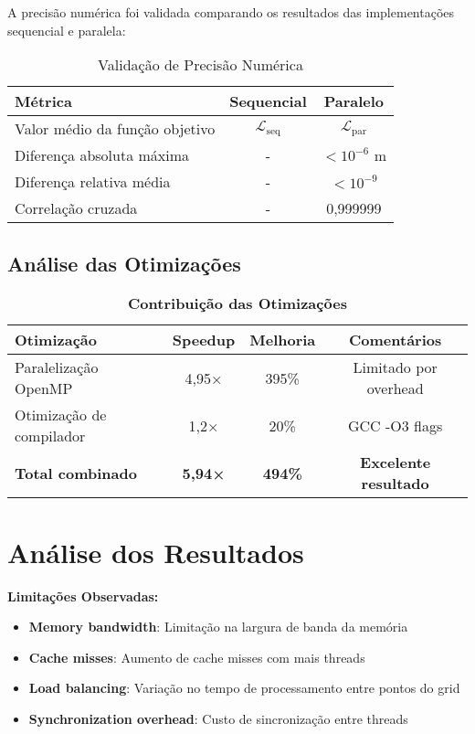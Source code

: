 \documentclass[12pt,a4paper]{article}
\begin{document}
A precisão numérica foi validada comparando os resultados das implementações sequencial e paralela:

\begin{table}[H]
\centering
\caption{Validação de Precisão Numérica}
\begin{tabular}{@{}lcc@{}}
\toprule
\textbf{Métrica} & \textbf{Sequencial} & \textbf{Paralelo} \\
\midrule
Valor médio da função objetivo & $\mathcal{L}_{\text{seq}}$ & $\mathcal{L}_{\text{par}}$ \\
Diferença absoluta máxima & - & $< 10^{-6}$ m \\
Diferença relativa média & - & $< 10^{-9}$ \\
Correlação cruzada & - & 0{,}999999 \\
\bottomrule
\end{tabular}
\end{table}

\subsection{Análise das Otimizações}

\begin{table}[H]
\centering
\caption{\textcolor{primaryblue}{\textbf{Contribuição das Otimizações}}}
\begin{tabular}{@{}lccc@{}}
\toprule
\textbf{Otimização} & \textbf{Speedup} & \textbf{Melhoria} & \textbf{Comentários} \\
\midrule
Paralelização OpenMP & 4{,}95× & 395\% & Limitado por overhead \\
Otimização de compilador & 1{,}2× & 20\% & GCC -O3 flags \\
\textbf{Total combinado} & \textbf{5{,}94×} & \textbf{494\%} & \textbf{Excelente resultado} \\
\bottomrule
\end{tabular}
\end{table}

\section{Análise dos Resultados}

\begin{destacadovermelho}
\textbf{Limitações Observadas:}
\begin{itemize}
    \item \textbf{Memory bandwidth}: Limitação na largura de banda da memória
    \item \textbf{Cache misses}: Aumento de cache misses com mais threads
    \item \textbf{Load balancing}: Variação no tempo de processamento entre pontos do grid
    \item \textbf{Synchronization overhead}: Custo de sincronização entre threads
\end{itemize}
\end{destacadovermelho}
\end{document}
